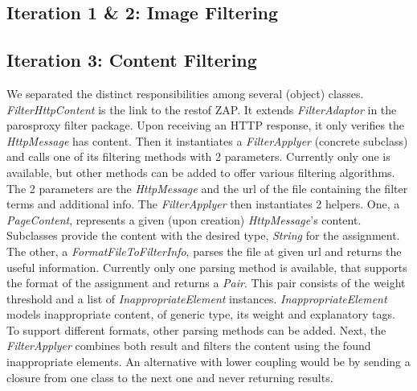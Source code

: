 \subsection{Iteration 1 \& 2: Image Filtering}


\subsection{Iteration 3: Content Filtering}
We separated the distinct responsibilities among several (object) classes. \textit{FilterHttpContent} is the link to the restof ZAP. It extends \textit{FilterAdaptor} in the parosproxy filter package. Upon receiving an HTTP response, it only verifies the \textit{HttpMessage} has content. Then it instantiates a \textit{FilterApplyer} (concrete subclass) and calls one of its filtering methods with 2 parameters. Currently only one is available, but other methods can be added to offer various filtering algorithms. The 2 parameters are the \textit{HttpMessage} and the url of the file containing the filter terms and additional info.
The \textit{FilterApplyer} then instantiates 2 helpers. One, a \textit{PageContent}, represents a given (upon creation) \textit{HttpMessage}'s content. Subclasses provide the content with the desired type, \textit{String} for the assignment. The other, a \textit{FormatFileToFilterInfo}, parses the file at given url and returns the useful information. Currently only one parsing method is available, that supports the format of the assignment and returns a \textit{Pair}. This pair consists of the weight threshold and a list of \textit{InappropriateElement} instances. \textit{InappropriateElement} models inappropriate content, of generic type, its weight and explanatory tags. To support different formats, other parsing methods can be added.
Next, the \textit{FilterApplyer} combines both result and filters the content using the found inappropriate elements.
An alternative with lower coupling would be by sending a closure from one class to the next one and never returning results.
